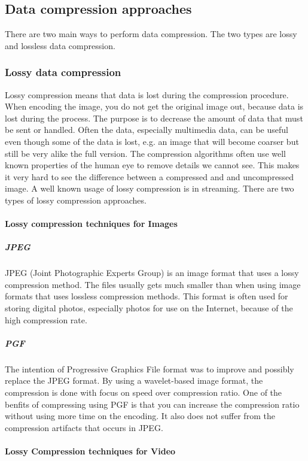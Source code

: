 \subsection{Data compression approaches}
There are two main ways to perform data compression. The two types are lossy and lossless data compression. \cite{bib:dataCompression}

\subsubsection{Lossy data compression}
Lossy compression means that data is lost during the compression procedure. When encoding the image, you do not get the original image out, because data is lost during the process. The purpose is to decrease the amount of data that must be sent or handled. Often the data, especially multimedia data, can be useful even though some of the data is lost, e.g. an image that will become coarser but still be very alike the full version. The compression algorithms often use well known properties of the human eye to remove details we cannot see. This makes it very hard to see the difference between a compressed and and uncompressed image. A well known usage of lossy compression is in streaming. There are two types of lossy compression approaches. \cite{bib:lossyCompression}

\paragraph{Lossy compression techniques for Images}

\subparagraph{JPEG}
JPEG (Joint Photographic Experts Group) is an image format that uses a lossy compression method. The files usually gets much smaller than when using image formats that uses lossless compression methods. This format is often used for storing digital photos, especially photos for use on the Internet, because of the high compression rate. \cite{bib:JPEG}


\subparagraph{PGF}
The intention of Progressive Graphics File format was to improve and possibly replace the JPEG format. By using a wavelet-based image format, the compression is done with focus on speed over compression ratio. One of the benfits of compressing using PGF is that you can increase the compression ratio without using more time on the encoding. It also does not suffer from the compression artifacts that occurs in JPEG.
\cite{bib:PGF}


\paragraph{Lossy Compression techniques for Video}


